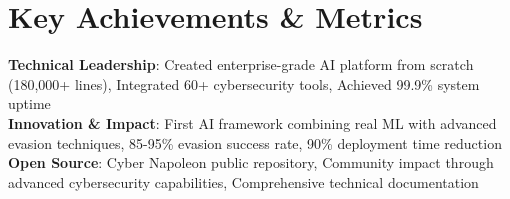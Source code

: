 \documentclass[letterpaper,11pt]{article}
\begin{document}
\section{Key Achievements \& Metrics}
 \begin{itemize}[leftmargin=0.15in, label={}]
    \small{\item{
     \textbf{Technical Leadership}: Created enterprise-grade AI platform from scratch (180,000+ lines), Integrated 60+ cybersecurity tools, Achieved 99.9\% system uptime \\
     \textbf{Innovation \& Impact}: First AI framework combining real ML with advanced evasion techniques, 85-95\% evasion success rate, 90\% deployment time reduction \\
     \textbf{Open Source}: Cyber Napoleon public repository, Community impact through advanced cybersecurity capabilities, Comprehensive technical documentation
    }}
 \end{itemize}

\vfill
{}
\end{document}

